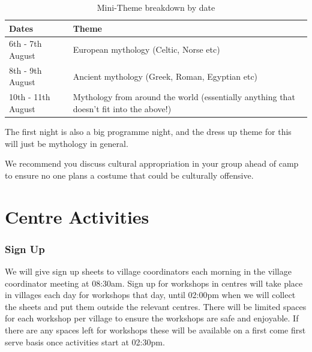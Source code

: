 \documentclass[a4paper, 11pt]{report}
\newcommand{\nl}{\newline}
\begin{document}
\begin{table}[H]
    \centering
    {\RaggedRight
    \begin{tabular}{p{} p{}}
        \textbf{Dates} & \textbf{Theme}\\
        \hline
        6th - 7th August & European mythology (Celtic, Norse etc)\\
        \hline
        8th - 9th August & Ancient mythology (Greek, Roman, Egyptian etc)\\
        \hline
        10th - 11th August & Mythology from around the world (essentially anything that doesn't fit into the above!)\\
        \hline
    \end{tabular}
    }%
    \caption{Mini-Theme breakdown by date}
\end{table}
The first night is also a big programme night, and the dress up theme for this will just be mythology in general. \nl

We recommend you discuss cultural appropriation in your group ahead of camp to ensure no one plans a costume that could be culturally offensive.

\section{Centre Activities}
\subsubsection{Sign Up}
We will give sign up sheets to village coordinators each morning in the village coordinator meeting at 08:30am. Sign up for workshops in centres will take place in villages each day for workshops that day, until 02:00pm when we will collect the sheets and put them outside the relevant centres. There will be limited spaces for each workshop per village to ensure the workshops are safe and enjoyable. If there are any spaces left for workshops these will be available on a first come first serve basis once activities start at 02:30pm.
\end{document}

